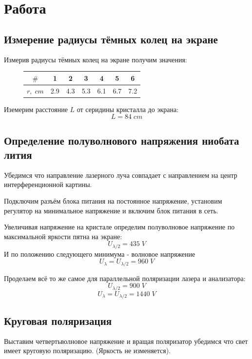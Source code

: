 \documentclass{article}
\begin{document}
\section{Работа}
\subsection{Измерение радиусы тёмных колец на экране}
Измерив радиусы тёмных колец на экране получим значения:

\begin{figure}[H]
  \centering
  \begin{tabular}[center]{|c|c|c|c|c|c|c|}
    \hline
    \(\#\)      & 1   & 2   & 3   & 4   & 5   & 6\\\hline
    \(r,\; cm\) & 2.9 & 4.3 & 5.3 & 6.1 & 6.7 & 7.2\\\hline
  \end{tabular}
\end{figure}

Иземерим расстояние \(L\) от серидины кристалла до экрана:
\[ L = 84\;cm \]

\subsection{Определение полуволнового напряжения ниобата лития} \label{sec:U}
Убедимся что направление лазерного луча совпадает с направлением на центр интерференционной картины.

Подключим разъём блока питания на постоянное напряжение, установим регулятор на минимальное
напряжение и включим блок питания в сеть.

Увеличивая напряжение на кристале определим полуволновое напряжение по максимальной яркости пятна на
экране:
\begin{equation} \label{eq:U0.5}
  U_{\lambda/2} = 435\;V
\end{equation}
И по положению следующего минимума - волновое напряжение
\[ U_{\lambda} = U_{\lambda/2} = 960\; V\]

Проделаем всё то же самое для параллельной поляризации лазера и анализатора:
\[ U_{\lambda/2} = 900\;V\]
\[ U_{\lambda} = U_{\lambda/2} = 1440\;V\]

\subsection{Круговая поляризация}
Выставим четвертьволновое напряжение и вращая поляризатор убедимся что свет имеет круговую поляризацию.
(Яркость не изменяется).
\end{document}
